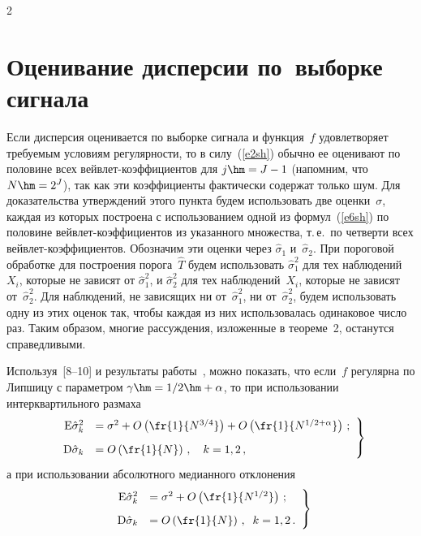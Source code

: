 \begin{multicols}{2}
\section{Оценивание дисперсии по~выборке сигнала}

Если дисперсия оценивается по выборке сигнала и функция~$f$ удовлетворяет 
требуемым условиям регулярности, то в силу~(\ref{e2sh}) 
обычно ее оценивают по половине всех вейвлет-коэффициентов для $j\hm=J-1$ (напомним, что 
$N\hm=2^J$), так как эти коэффициенты фактически содержат только шум. 
Для доказательства утверждений этого пункта будем использовать две оценки~$\sigma$, 
каждая из которых построена с использованием одной из формул~(\ref{e6sh}) 
по половине вейвлет-коэффициентов из указанного множества, т.\,е.\ 
по четверти всех вейвлет-ко\-эф\-фи\-ци\-ен\-тов. Обозначим эти оценки через 
$\hat{\sigma}_1$ и~$\hat{\sigma}_2$.
При пороговой обработке для построения порога~$\hat{T}$ будем
использовать $\hat{\sigma}_1^2$ для тех наблюдений~$X_i$, которые не
зависят от $\hat{\sigma}_1^2$, и $\hat{\sigma}_2^2$ для тех
наблюдений~$X_i$, которые не зависят от~$\hat{\sigma}_2^2$. Для
наблюдений, не зависящих ни от~$\hat{\sigma}_1^2$, ни от~$\hat{\sigma}_2^2$, 
будем использовать одну из этих оценок так,
чтобы каж\-дая из них использовалась одинаковое число раз. Таким
образом, многие рассуждения, изложенные в теореме~2, останутся
справедливыми.

Используя~[8--10] и результаты работы~\cite{7sh}, 
можно показать, что если~$f$ регулярна по Липшицу с параметром 
$\gamma\hm={1}/{2}\hm+\alpha$, то при использовании интерквартильного размаха
\begin{equation}
\left.
\begin{array}{rl}
\mbox{E}\hat{\sigma}_k^2&=\sigma^2+O\left(\fr{1}{N^{{3}/{4}}}\right)+
O\left(\fr{1}{N^{{1}/{2}+\alpha}}\right)\,;\\[9pt] 
\mbox{D}\hat{\sigma}_k&=O\left(\fr{1}{N}\right)\,,\quad
k=1,2\,,
\end{array}
\right\}
\label{e25sh}
\end{equation}
а при использовании абсолютного медианного отклонения
\begin{equation}
\left.
\begin{array}{rl}
\mbox{E}\hat{\sigma}_k^2&=\sigma^2+O\left(
\fr{1}{N^{{1}/{2}}}\right)\,;\\[9pt]
\mbox{D}\hat{\sigma}_k&=O\left(\fr{1}{N}\right)\,,\;\;k=1,2\,.
\end{array}
\right\}
\label{e26sh}
\end{equation}


\end{multicols}
